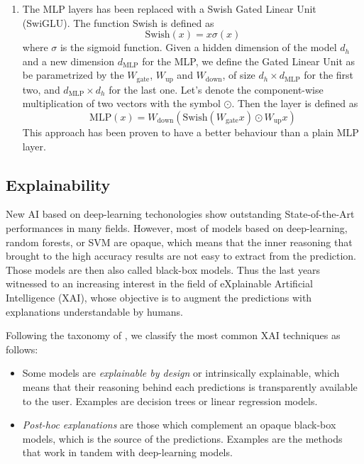 \documentclass[]{marticle}
\begin{document}
\begin{enumerate}
\item The MLP layers has been replaced with a Swish Gated Linear Unit (SwiGLU). The function Swish
is defined as
$$ \text{Swish}(x) = x \sigma(x) $$
where $\sigma$ is the sigmoid function. Given a hidden dimension of the model $d_h$ and a new
dimension $d_\text{MLP}$ for the MLP, we define the Gated Linear Unit as be parametrized by the
$W_\text{gate}$, $W_\text{up}$ and $W_\text{down}$, of size $d_h\times d_\text{MLP}$ for the first
two, and $d_\text{MLP} \times d_h$ for the last one. Let's denote the component-wise multiplication
of two vectors with the symbol $\odot$. Then the layer is defined as $$ \text{MLP}(x) =
W_\text{down} (\text{Swish}(W_\text{gate} x) \odot W_\text{up} x) $$ This approach has been proven
to have a better behaviour than a plain MLP layer.
\end{enumerate}

\subsection{Explainability}

New AI based on deep-learning techonologies show outstanding State-of-the-Art performances in many
fields. However, most of models based on deep-learning, random forests, or SVM are opaque, which
means that the inner reasoning that brought to the high accuracy results are not easy to extract
from the prediction.  Those models are then also called black-box models. Thus the last years
witnessed to an increasing interest in the field of eXplainable Artificial Intelligence (XAI), whose
objective is to augment the predictions with explanations understandable by humans.

Following the taxonomy of \cite{xai-survey}, we classify the most common XAI techniques as follows:

\begin{itemize}
\item Some models are \textit{explainable by design} or intrinsically explainable, which means that
    their reasoning behind each predictions is transparently available to the user. Examples are
    decision trees or linear regression models.

\item \textit{Post-hoc explanations} are those which complement an opaque black-box models, which is
    the source of the predictions. Examples are the methods that work in tandem with deep-learning
    models.
\end{itemize}
\end{document}
